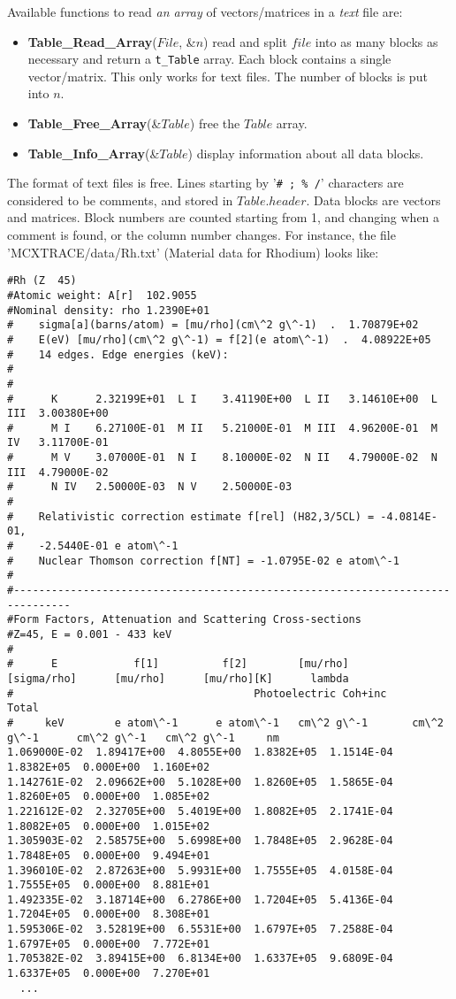 Available functions to read \emph{an array} of vectors/matrices in a \emph{text} file are:
\begin{itemize}
\item {\bfseries Table\_Read\_Array}($File$, \&$n$) read and split $file$
into as many blocks as necessary and return a \verb+t_Table+ array.
Each block contains a single vector/matrix. This only works for text files.
The number of blocks is put into $n$.
\item {\bfseries Table\_Free\_Array}(\&$Table$) free the $Table$ array.
\item {\bfseries Table\_Info\_Array}(\&$Table$) display information about all data blocks.
\end{itemize}

The format of text files is free. Lines starting by '\verb+# ; % /+' characters are considered to be comments, and stored in $Table.header$. Data blocks are vectors and matrices. Block numbers are counted starting from 1, and changing when a comment is found, or the column number changes. For instance, the file 'MCXTRACE/data/Rh.txt' (Material data for Rhodium) looks like:
\begin{lstlisting}
#Rh (Z  45) 
#Atomic weight: A[r]  102.9055 
#Nominal density: rho 1.2390E+01
#    sigma[a](barns/atom) = [mu/rho](cm\^2 g\^-1)  .  1.70879E+02
#    E(eV) [mu/rho](cm\^2 g\^-1) = f[2](e atom\^-1)  .  4.08922E+05
#    14 edges. Edge energies (keV):
#
#
#      K      2.32199E+01  L I    3.41190E+00  L II   3.14610E+00  L III  3.00380E+00
#      M I    6.27100E-01  M II   5.21000E-01  M III  4.96200E-01  M IV   3.11700E-01
#      M V    3.07000E-01  N I    8.10000E-02  N II   4.79000E-02  N III  4.79000E-02
#      N IV   2.50000E-03  N V    2.50000E-03
#
#    Relativistic correction estimate f[rel] (H82,3/5CL) = -4.0814E-01,
#    -2.5440E-01 e atom\^-1
#    Nuclear Thomson correction f[NT] = -1.0795E-02 e atom\^-1
#
#-------------------------------------------------------------------------------
#Form Factors, Attenuation and Scattering Cross-sections
#Z=45, E = 0.001 - 433 keV
#
#      E            f[1]          f[2]        [mu/rho]      [sigma/rho]      [mu/rho]      [mu/rho][K]      lambda
#                                      Photoelectric Coh+inc      Total
#     keV        e atom\^-1      e atom\^-1   cm\^2 g\^-1       cm\^2 g\^-1      cm\^2 g\^-1   cm\^2 g\^-1     nm
1.069000E-02  1.89417E+00  4.8055E+00  1.8382E+05  1.1514E-04  1.8382E+05  0.000E+00  1.160E+02
1.142761E-02  2.09662E+00  5.1028E+00  1.8260E+05  1.5865E-04  1.8260E+05  0.000E+00  1.085E+02
1.221612E-02  2.32705E+00  5.4019E+00  1.8082E+05  2.1741E-04  1.8082E+05  0.000E+00  1.015E+02
1.305903E-02  2.58575E+00  5.6998E+00  1.7848E+05  2.9628E-04  1.7848E+05  0.000E+00  9.494E+01
1.396010E-02  2.87263E+00  5.9931E+00  1.7555E+05  4.0158E-04  1.7555E+05  0.000E+00  8.881E+01
1.492335E-02  3.18714E+00  6.2786E+00  1.7204E+05  5.4136E-04  1.7204E+05  0.000E+00  8.308E+01
1.595306E-02  3.52819E+00  6.5531E+00  1.6797E+05  7.2588E-04  1.6797E+05  0.000E+00  7.772E+01
1.705382E-02  3.89415E+00  6.8134E+00  1.6337E+05  9.6809E-04  1.6337E+05  0.000E+00  7.270E+01
  ...
\end{lstlisting}
